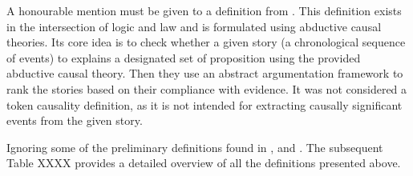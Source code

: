 \documentclass[11pt,a4paper]{book}
\theoremstyle{definition}
\theoremstyle{definition}
\theoremstyle{definition}
\theoremstyle{remark}
\begin{document}
A honourable mention must be given to a definition from \parencite{bex2010hybrid}. This definition exists in the intersection of logic and law and is formulated using abductive causal theories. Its core idea is to check whether a given story (a chronological sequence of events) to explains a designated set of proposition using the provided abductive causal theory. Then they use an abstract argumentation framework to rank the stories based on their compliance with evidence. It was not considered a token causality definition, as it is not intended for extracting causally significant events from the given story.


Ignoring some of the preliminary definitions found in \parencite{halpern2015graded}, \parencite{weslake2015partial} and \parencite{glymour2010actual}. The subsequent Table XXXX provides a detailed overview of all the definitions presented above. 
\end{document}
